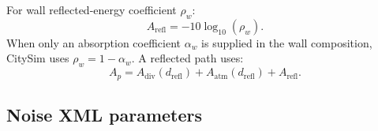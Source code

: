 \documentclass[11pt,a4paper]{article}
\begin{document}
For wall reflected-energy coefficient $\rho_w$:
\begin{equation}
  A_{\mathrm{refl}}=-10\log_{10}(\rho_w).
  \label{eq:noise-reflection}
\end{equation}
When only an absorption coefficient $\alpha_w$ is supplied in the wall
composition, CitySim uses $\rho_w=1-\alpha_w$.
A reflected path uses:
\begin{equation}
  A_p=A_{\mathrm{div}}(d_{\mathrm{refl}})
     +A_{\mathrm{atm}}(d_{\mathrm{refl}})
     +A_{\mathrm{refl}}.
\end{equation}

\subsection{Noise XML parameters}
\end{document}
